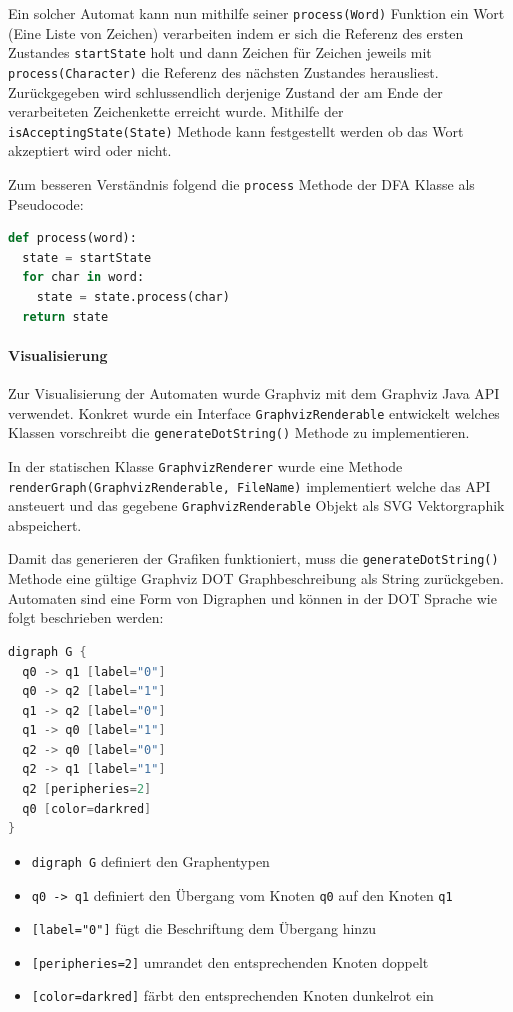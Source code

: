 Ein solcher Automat kann nun mithilfe seiner \lstinline$process(Word)$ Funktion ein Wort (Eine Liste von Zeichen) verarbeiten indem er sich die Referenz des ersten Zustandes \lstinline$startState$ holt und dann Zeichen für Zeichen jeweils mit \lstinline$process(Character)$ die Referenz des nächsten Zustandes herausliest. Zurückgegeben wird schlussendlich derjenige Zustand der am Ende der verarbeiteten Zeichenkette erreicht wurde. Mithilfe der \lstinline$isAcceptingState(State)$ Methode kann festgestellt werden ob das Wort akzeptiert wird oder nicht. 

Zum besseren Verständnis folgend die \lstinline$process$ Methode der DFA Klasse als Pseudocode:

\begin{lstlisting}[language=Python, caption={Process Methode der DFA Klasse}]
def process(word):
  state = startState
  for char in word:
    state = state.process(char)
  return state
\end{lstlisting}

\paragraph{Visualisierung}
Zur Visualisierung der Automaten wurde Graphviz \cite{graphviz} mit dem Graphviz Java API \cite{graphvizjava} verwendet. Konkret wurde ein Interface \lstinline$GraphvizRenderable$ entwickelt welches Klassen vorschreibt die \lstinline$generateDotString()$ Methode zu implementieren.

In der statischen Klasse \lstinline$GraphvizRenderer$ wurde eine Methode \lstinline$renderGraph(GraphvizRenderable, FileName)$ implementiert welche das API ansteuert und das gegebene \lstinline$GraphvizRenderable$ Objekt als SVG Vektorgraphik abspeichert.

Damit das generieren der Grafiken funktioniert, muss die \lstinline$generateDotString()$ Methode eine gültige Graphviz DOT Graphbeschreibung als String zurückgeben. Automaten sind eine Form von Digraphen und können in der DOT Sprache wie folgt beschrieben werden:

\begin{lstlisting}[language=Java, caption={Automat in DOT Sprache}, label={lst:dot_language}]
digraph G {
  q0 -> q1 [label="0"]
  q0 -> q2 [label="1"]
  q1 -> q2 [label="0"]
  q1 -> q0 [label="1"]
  q2 -> q0 [label="0"]
  q2 -> q1 [label="1"]
  q2 [peripheries=2]
  q0 [color=darkred]
}
\end{lstlisting}

\begin{itemize}
  \item \lstinline$digraph G$ definiert den Graphentypen
  \item \lstinline$q0 -> q1$ definiert den Übergang vom Knoten \lstinline$q0$ auf den Knoten \lstinline$q1$
  \item \lstinline$[label="0"]$ fügt die Beschriftung \frqq dem Übergang hinzu
  \item \lstinline$[peripheries=2]$ umrandet den entsprechenden Knoten doppelt
  \item \lstinline$[color=darkred]$ färbt den entsprechenden Knoten dunkelrot ein
\end{itemize}

